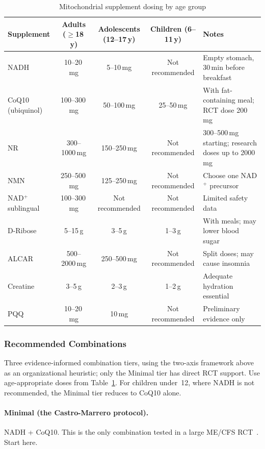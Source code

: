\begin{table}[htbp]
\centering
\caption{Mitochondrial supplement dosing by age group}
\label{tab:mito-dosing-by-age}
\small
\begin{tabularx}{\textwidth}{l c c c X}
\toprule
\textbf{Supplement} & \textbf{Adults ($\geq$18\,y)} & \textbf{Adolescents (12--17\,y)} & \textbf{Children (6--11\,y)} & \textbf{Notes} \\
\midrule
NADH & 10--20\,mg & 5--10\,mg & Not recommended & Empty stomach, 30\,min before breakfast \\
CoQ10 (ubiquinol) & 100--300\,mg & 50--100\,mg & 25--50\,mg & With fat-containing meal; RCT dose 200\,mg \\
NR & 300--1000\,mg & 150--250\,mg & Not recommended & 300--500\,mg starting; research doses up to 2000\,mg \\
NMN & 250--500\,mg & 125--250\,mg & Not recommended & Choose one NAD$^+$ precursor \\
NAD$^+$ sublingual & 100--300\,mg & Not recommended & Not recommended & Limited safety data \\
D-Ribose & 5--15\,g & 3--5\,g & 1--3\,g & With meals; may lower blood sugar \\
ALCAR & 500--2000\,mg & 250--500\,mg & Not recommended & Split doses; may cause insomnia \\
Creatine & 3--5\,g & 2--3\,g & 1--2\,g & Adequate hydration essential \\
PQQ & 10--20\,mg & 10\,mg & Not recommended & Preliminary evidence only \\
\bottomrule
\end{tabularx}
\end{table}

\subsubsection{Recommended Combinations}

Three evidence-informed combination tiers, using the two-axis framework above as an organizational heuristic; only the Minimal tier has direct RCT support. Use age-appropriate doses from Table~\ref{tab:mito-dosing-by-age}. For children under~12, where NADH is not recommended, the Minimal tier reduces to CoQ10 alone.

\paragraph{Minimal (the Castro-Marrero protocol).} NADH + CoQ10. This is the only combination tested in a large ME/CFS RCT~\cite{CastroMarrero2021fatigue}. Start here.

